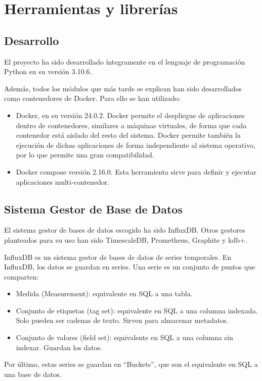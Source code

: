 \section{Herramientas y librerías}

\subsection{Desarrollo}

El proyecto ha sido desarrollado íntegramente en el lenguaje de programación Python en su versión 3.10.6.

Además, todos los módulos que más tarde se explican han sido desarrollados como contenedores de Docker. Para ello 
se han utilizado:
\begin{itemize}
    \item Docker, en su versión 24.0.2. Docker permite el despliegue de aplicaciones dentro de contenedores, similares
        a máquinas virtuales, de forma que cada contenedor está aislado del resto del sistema. Docker permite también
        la ejecución de dichas aplicaciones de forma independiente al sistema operativo, por lo que permite una gran 
        compatibilidad. 
    \item Docker compose versión 2.16.0. Esta herramienta sirve para definir y ejecutar aplicaciones multi-contenedor.
\end{itemize}

\subsection{Sistema Gestor de Base de Datos}

El sistema gestor de bases de datos escogido ha sido InfluxDB. Otros gestores planteados para su uso han sido
TimescaleDB, Prometheus, Graphite y kdb+.

InfluxDB es un sistema gestor de bases de datos de series temporales. En InfluxDB, los datos se guardan en series. 
Una serie es un conjunto de puntos que comparten:
\begin{itemize}
    \item Medida (Measurement): equivalente en SQL a una tabla.
    \item Conjunto de etiquetas (tag set): equivalente en SQL a una columna indexada. Solo pueden ser cadenas de texto.
        Sirven para almacenar metadatos.
    \item Conjunto de valores (field set): equivalente en SQL a una columna sin indexar. Guardan los datos.
\end{itemize}
Por último, estas series se guardan en ``Buckets'', que son el equivalente en SQL a una base de datos.

